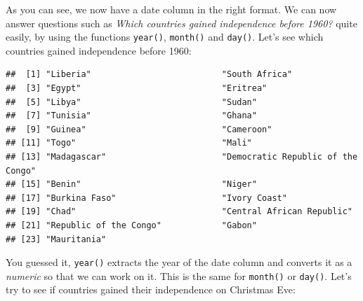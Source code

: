 \documentclass[]{gitbook}
\newenvironment{Shaded}{\begin{snugshade}}{\end{snugshade}}
\newcommand{\DecValTok}[1]{\textcolor[rgb]{0.00,0.00,0.81}{#1}}
\newcommand{\KeywordTok}[1]{\textcolor[rgb]{0.13,0.29,0.53}{\textbf{#1}}}
\newcommand{\NormalTok}[1]{#1}
\newcommand{\OperatorTok}[1]{\textcolor[rgb]{0.81,0.36,0.00}{\textbf{#1}}}
\newcommand{\StringTok}[1]{\textcolor[rgb]{0.31,0.60,0.02}{#1}}
\theoremstyle{definition}
\theoremstyle{definition}
\theoremstyle{definition}
\theoremstyle{remark}
\begin{document}
As you can see, we now have a date column in the right format. We can
now answer questions such as \emph{Which countries gained independence
before 1960?} quite easily, by using the functions \texttt{year()},
\texttt{month()} and \texttt{day()}. Let's see which countries gained
independence before 1960:

\begin{Shaded}
\end{Shaded}

\begin{verbatim}
##  [1] "Liberia"                          "South Africa"                    
##  [3] "Egypt"                            "Eritrea"                         
##  [5] "Libya"                            "Sudan"                           
##  [7] "Tunisia"                          "Ghana"                           
##  [9] "Guinea"                           "Cameroon"                        
## [11] "Togo"                             "Mali"                            
## [13] "Madagascar"                       "Democratic Republic of the Congo"
## [15] "Benin"                            "Niger"                           
## [17] "Burkina Faso"                     "Ivory Coast"                     
## [19] "Chad"                             "Central African Republic"        
## [21] "Republic of the Congo"            "Gabon"                           
## [23] "Mauritania"
\end{verbatim}

You guessed it, \texttt{year()} extracts the year of the date column and
converts it as a \emph{numeric} so that we can work on it. This is the
same for \texttt{month()} or \texttt{day()}. Let's try to see if
countries gained their independence on Christmas Eve:

\begin{Shaded}
\end{Shaded}
\end{document}
